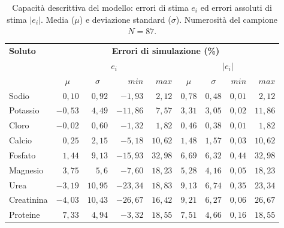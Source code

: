 \documentclass[10pt,twoside]{book}
\begin{document}
\begin{table}[htb]
	\centering
	\caption{Capacità descrittiva del modello: errori di stima $e_i$ ed errori assoluti di stima $|e_i|$. Media ($\mu$) e deviazione standard ($\sigma$). Numerosità del campione $N=87$.}\label{tab:descrizione}
	\begin{tabular}{lrrrrrrrr}
	\toprule 
		\textbf{Soluto}   &  \multicolumn{8}{c}{\textbf{Errori di simulazione (\%)}}  \\
		\cmidrule(lr){2-9}
				              &        \multicolumn{4}{c}{$e_i$}             &       \multicolumn{4}{c}{$|e_i|$}             \\
		                  & \multicolumn{1}{c}{$\mu$}      & \multicolumn{1}{c}{$\sigma$}   & $min$   & $max$   & \multicolumn{1}{c}{$\mu$}     & \multicolumn{1}{c}{$\sigma$}   & $min$   & $max$  \\
    \cmidrule(lr){2-5}\cmidrule(lr){6-9}
  	Sodio             & $ 0,10$     & $ 0,92$    & $ -1,93$  & $2,12$  & $0,78$   & $0,48$     & $0,01$ & $ 2,12$   \\
  	Potassio          & $-0,53$     & $ 4,49$    & $-11,86$  & $7,57$  & $3,31$   & $3,05$     & $0,02$ & $11,86$  \\
  	Cloro             & $-0,02$     & $ 0,60$    & $ -1,32$  & $1,82$  & $0,46$   & $0,38$     & $0,01$ & $ 1,82$   \\
  	Calcio            & $ 0,25$     & $ 2,15$    & $ -5,18$  & $10,62$ & $1,48$   & $1,57$     & $0,03$ & $10,62$  \\
  	Fosfato           & $ 1,44$     & $ 9,13$    & $-15,93$  & $32,98$ & $6,69$   & $6,32$     & $0,44$ & $32,98$  \\
  	Magnesio          & $ 3,75$     & $ 5,6 $    & $ -7,60$  & $18,23$ & $5,28$   & $4,16$     & $0,05$ & $18,23$  \\
  	Urea              & $-3,19$     & $10,95$    & $-23,34$  & $18,83$ & $9,13$   & $6,74$     & $0,35$ & $23,34$  \\
  	Creatinina        & $-4,03$     & $10,43$    & $-26,67$  & $16,42$ & $9,21$   & $6,27$     & $0,06$ & $26,67$  \\
  	Proteine          & $ 7,33$     & $ 4,94$    & $ -3,32$  & $18,55$ & $7,51$   & $4,66$     & $0,16$ & $18,55$  \\
  \bottomrule
\end{tabular}
\end{table}
\end{document}
